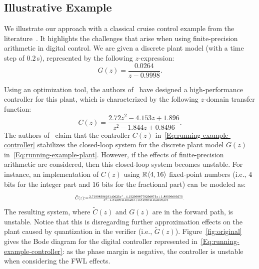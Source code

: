 \documentclass[final]{sig-alternate-05-2015}
\newcommand{\aabatecmt}[1]{}%
\newcommand{\dariocmt}[1]{}%
\begin{document}
\subsection{Illustrative Example} \label{sec:running-ex}

We illustrate our approach with a classical cruise control example from the
literature~\cite{Astrom08}.  It highlights the challenges that
arise when using finite-precision arithmetic in digital control.  We are
given a discrete plant model (with a time step of $0.2$\,s), 
represented by the following $z$-expression:
%
\begin{equation}
\label{Eq:running-example-plant}
G(z) = \frac{0.0264}{z-0.9998}.
\end{equation}

Using an optimization tool, the authors
of~\cite{DBLP:conf/hybrid/WangGRJF16} have designed a high-performance
controller for this plant, which is characterized by the following
$z$-domain transfer function:
%
\begin{equation}
\label{Eq:running-example-controller}
C(z) = \frac{2.72z^2 - 4.153z + 1.896}{z^2 - 1.844z + 0.8496}.
\end{equation}
%
The authors of~\cite{DBLP:conf/hybrid/WangGRJF16} claim that the controller
$C(z)$ in~\eqref{Eq:running-example-controller} stabilizes the closed-loop
system for the discrete plant model $G(z)$
in~\eqref{Eq:running-example-plant}.  However, if the effects of
finite-precision arithmetic are considered, then this closed-loop system
becomes unstable.
%
For instance, an implementation of $C(z)$ using 
$\mathbb R \langle{4},{16}\rangle$ fixed-point
numbers (i.e., $4$ bits for the integer part and $16$ bits for the
fractional part) can be modeled as: 
%
\begin{equation}
\label{Eq:running-example-controller-quantized}
\resizebox{.47\textwidth}{!}{
$\tilde{C}(z) {:=} \frac{2.7199859619140625z^2{-}4.1529998779296875z
{+}1.89599609375}{z^2{-}1.843994140625z+0.8495941162109375}$. 
}
\end{equation} 
%
The resulting system, 
where $\tilde{C}(z)$ and $G(z)$ are in the forward path, is unstable. 
Notice that this is disregarding further approximation effects on the plant caused by quantization in the verifier (i.e., $\tilde{G}(z)$).
Figure~\ref{fig:original} gives the Bode diagram for the digital controller
represented in~\eqref{Eq:running-example-controller}: 
as the phase margin is negative, 
the controller is unstable when considering the FWL effects.
\end{document}
